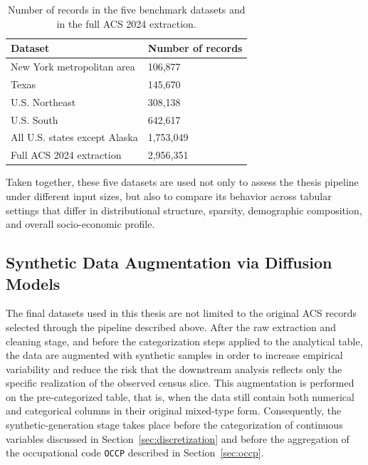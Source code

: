 \begin{table}[htbp]
\centering
\renewcommand{\arraystretch}{1.2}
\caption{Number of records in the five benchmark datasets and in the full ACS 2024 extraction.}
\label{tab:dataset-cardinality}
\begin{tabular}{>{\raggedright\arraybackslash}p{} p{}}
  \toprule
  \textbf{Dataset} & \textbf{Number of records} \\
  \midrule
  New York metropolitan area & 106,877 \\
  Texas & 145,670 \\
  U.S. Northeast & 308,138 \\
  U.S. South & 642,617 \\
  All U.S. states except Alaska & 1,753,049 \\
  Full ACS 2024 extraction & 2,956,351 \\
  \bottomrule
\end{tabular}
\renewcommand{\arraystretch}{1.0}
\end{table}

Taken together, these five datasets are used not only to assess the thesis pipeline under different input sizes, but also to compare its behavior across tabular settings that differ in distributional structure, sparsity, demographic composition, and overall socio-economic profile. 

\subsection{Synthetic Data Augmentation via Diffusion Models}
\label{sec:synthetic-augmentation}

The final datasets used in this thesis are not limited to the original ACS records selected through the pipeline described above. After the raw extraction and cleaning stage, and before the categorization steps applied to the analytical table, the data are augmented with synthetic samples in order to increase empirical variability and reduce the risk that the downstream analysis reflects only the specific realization of the observed census slice. This augmentation is performed on the pre-categorized table, that is, when the data still contain both numerical and categorical columns in their original mixed-type form. Consequently, the synthetic-generation stage takes place before the categorization of continuous variables discussed in Section~\ref{sec:discretization} and before the aggregation of the occupational code \texttt{OCCP} described in Section~\ref{sec:occp}.

